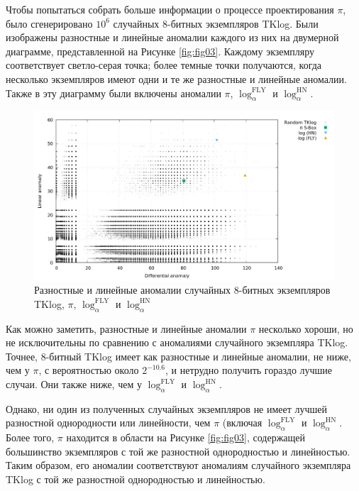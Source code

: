 Чтобы попытаться собрать больше информации о процессе проектирования \(\pi\), было сгенерировано \(10^6\) случайных 8-битных экземпляров TKlog. Были изображены разностные и линейные аномалии каждого из них на двумерной диаграмме, представленной на Рисунке \eqref{fig:fig03}. Каждому экземпляру соответствует светло-серая точка; более темные точки получаются, когда несколько экземпляров имеют одни и те же разностные и линейные аномалии. Также в эту диаграмму были включены аномалии \(\pi\), \(\log^{\text{FLY}}_\alpha\) и \(\log^{\text{HN}}_\alpha\).

\begin{figure}
  \centering
  \includegraphics[scale=0.7]{contents/pics/anomalies.png}
  \caption{Разностные и линейные аномалии случайных 8-битных экземпляров TKlog, \(\pi\), \(\log^{\text{FLY}}_\alpha\) и \(\log^{\text{HN}}_\alpha\)}
  \label{fig:fig03}
\end{figure}

Как можно заметить, разностные и линейные аномалии \(\pi\) несколько хороши, но не исключительны по сравнению с аномалиями случайного экземпляра TKlog. Точнее, 8-битный TKlog имеет как разностные и линейные аномалии, не ниже, чем у \(\pi\), с вероятностью около \(2^{-10.6}\), и нетрудно получить гораздо лучшие случаи. Они также ниже, чем у \(\log^{\text{FLY}}_\alpha\) и \(\log^{\text{HN}}_\alpha\).

Однако, ни один из полученных случайных экземпляров не имеет лучшей разностной однородности или линейности, чем \(\pi\) (включая \(\log^{\text{FLY}}_\alpha\) и \(\log^{\text{HN}}_\alpha\). Более того, \(\pi\) находится в области на Рисунке \eqref{fig:fig03}, содержащей большинство экземпляров с той же разностной однородностью и линейностью. Таким образом, его аномалии соответствуют аномалиям случайного экземпляра TKlog с той же разностной однородностью и линейностью.

